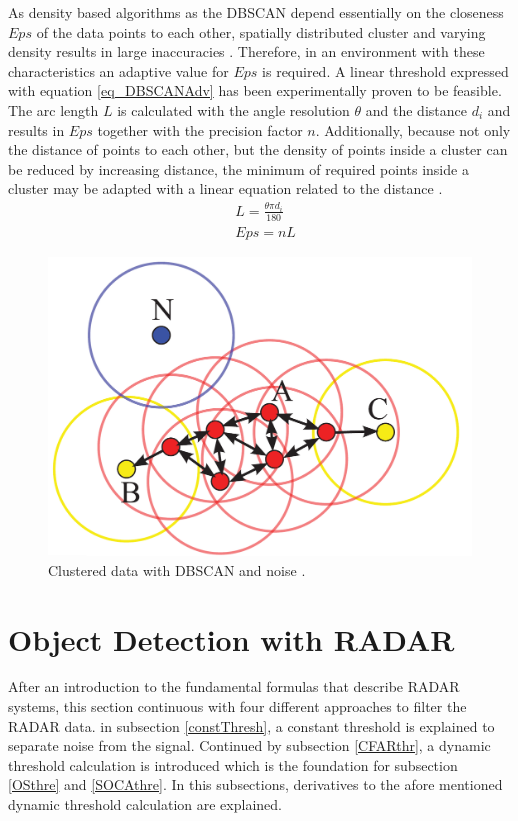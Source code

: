 As density based algorithms as the \ac{DBSCAN} depend essentially on the closeness $Eps$ of the data points to each other, spatially distributed cluster and varying density results in large inaccuracies \cite{ClusterOver}. Therefore, in an environment with these characteristics an adaptive value for $Eps$ is required. A linear threshold expressed with equation \ref{eq_DBSCANAdv} has been experimentally proven to be feasible. The arc length $L$ is calculated with the angle resolution $\theta$ and the distance $d_i$ and results in $Eps$ together with the precision factor $n$. Additionally, because not only the distance of points to each other, but the density of points inside a cluster can be reduced by increasing distance, the minimum of required points inside a cluster may be adapted with a linear equation related to the distance \cite{AdvancedDBSCAN}.
\begin{equation}
\begin{aligned} 
\label{eq_DBSCANAdv}
& L= \frac{\theta\pi d_i}{180}  \\
& Eps = nL
\end{aligned}
\end{equation}

 
   
   \begin{figure}
   	\begin{centering}
   		\includegraphics[width=0.5\linewidth,keepaspectratio]{Bilder/DBSCAN.png}
   		\caption{Clustered data with \ac{DBSCAN} and noise \cite{DBSCANRev}.}
   		\label{fig_DBSCAN}%
   	\end{centering}
   \end{figure}
   
   
   \section{Object Detection with \ac{RADAR}} \label{RADAR}
   After an introduction to the fundamental formulas that describe \ac{RADAR} systems, this section continuous with four different approaches to filter the \ac{RADAR} data. in subsection \ref{constThresh}, a constant threshold is explained to separate noise from the signal. Continued by subsection \ref{CFARthr}, a dynamic threshold calculation is introduced which is the foundation for subsection \ref{OSthre} and \ref{SOCAthre}. In this subsections, derivatives to the afore mentioned dynamic threshold calculation are explained.\\  
   
